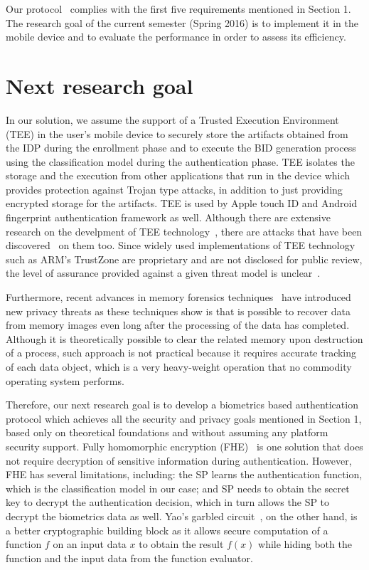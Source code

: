 \documentclass[10pt]{article}
\begin{document}
Our protocol~\cite{ours} complies with the first five requirements mentioned in Section 1. The research goal of the current  semester (Spring 2016) is to implement it in the mobile device and to evaluate the performance in order to assess its efficiency.

\section{Next research goal}
In our solution, we assume the support of a Trusted Execution Environment  (TEE) in the user's mobile device to securely store the 
artifacts obtained from the IDP during the enrollment phase and to execute the BID generation process using the classification model during the 
authentication phase. 
TEE isolates the storage and the execution from other applications that run in the device which provides protection against Trojan type attacks, in 
addition to just providing encrypted storage for the artifacts. TEE is used by Apple touch ID and Android fingerprint authentication framework as well.
Although there are extensive research on the develpment of TEE technology~\cite{tee}, there are attacks that have been discovered~\cite{blackhat} on 
them too.
Since widely used implementations of TEE technology such as ARM's TrustZone are proprietary and are not disclosed for public review, the level of 
assurance provided against a given threat model is unclear~\cite{armtrustzone}. 

Furthermore, recent advances in memory forensics techniques~\cite{dimsum} have introduced new privacy threats as these techniques show is that is 
possible to recover data from memory images even long after the processing of the data has completed. 
Although it is theoretically possible to clear the related memory upon destruction of a process, such approach is not practical because it requires 
accurate tracking of each data object, which is a very heavy-weight operation that no commodity operating system performs.

Therefore, our next research goal is to develop a biometrics based authentication protocol which achieves all the security and 
privacy goals mentioned in Section 1, based only on theoretical foundations and without assuming any platform security support. Fully homomorphic 
encryption (FHE)~\cite{fhe} is one solution that does not require decryption of sensitive information during authentication. However, FHE has several 
limitations, including: the SP learns the authentication function, which is the classification model 
in our case; and SP needs to obtain the secret key to decrypt the authentication decision, which in turn allows the SP to decrypt the biometrics data 
as well. 
Yao's garbled circuit~\cite{yaogc}, on the other hand, is a better cryptographic 
building block as it allows secure computation of a function $f$ on an input data $x$ to obtain the result $f(x)$ while hiding both the function and the 
input data from the function evaluator.\\
\end{document}
